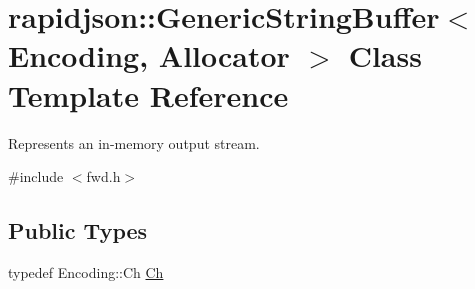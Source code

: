 \hypertarget{classrapidjson_1_1_generic_string_buffer}{}\section{rapidjson\+::Generic\+String\+Buffer$<$ Encoding, Allocator $>$ Class Template Reference}
\label{classrapidjson_1_1_generic_string_buffer}


Represents an in-\/memory output stream.  




{\ttfamily \#include $<$fwd.\+h$>$}

\subsection*{Public Types}
\begin{DoxyCompactItemize}
\item 
typedef Encoding\+::\+Ch \mbox{\hyperlink{classrapidjson_1_1_generic_string_buffer_a315f6f4528438a19d5a93eac3e2c99f0}{Ch}}
\end{DoxyCompactItemize}
